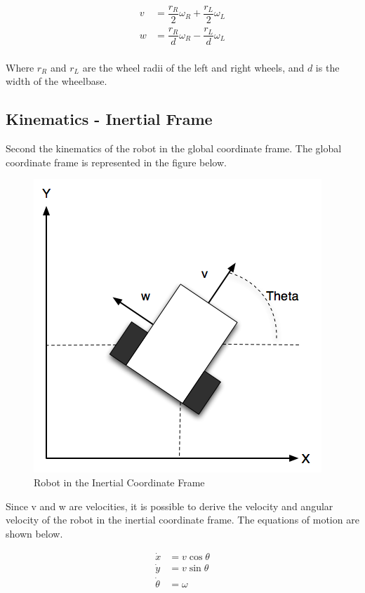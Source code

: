 \documentclass[10pt]{amsart}
\begin{document}
\begin{equation}
  \begin{aligned}
    v &= \dfrac{r_R}{2} \omega_R + \dfrac{r_L}{2} \omega_L \\
    w &= \dfrac{r_R}{d} \omega_R - \dfrac{r_L}{d} \omega_L
  \end{aligned}
\end{equation}
\\
Where $r_{R}$ and $r_{L}$ are the wheel radii of the left and right wheels, and $d$ is the width of the wheelbase.


\subsection{Kinematics - Inertial Frame}
Second the kinematics of the robot in the global coordinate frame.  The global coordinate frame is represented in the figure below.

\begin{figure}[h]
 \centering
 \includegraphics[scale=0.4,keepaspectratio=true]{./global.png}
 \caption{Robot in the Inertial Coordinate Frame}
 \label{fig:global}
\end{figure}

Since v and w are velocities, it is possible to derive the velocity and angular velocity of the robot in the inertial coordinate frame.  The equations of motion are shown below.

\begin{equation}
\begin{align}
\dot{x} &= v \cos{\theta} \\
\dot{y} &= v \sin{\theta} \\
\dot{\theta} &= \omega
\end{align}
\end{equation}
\end{document}
